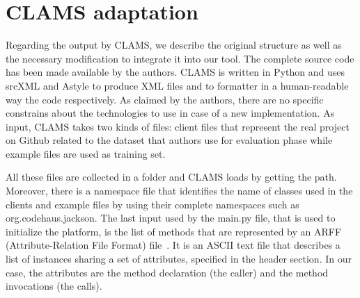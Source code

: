 





\section{CLAMS adaptation}

Regarding the output by CLAMS, we describe the original structure as well as the necessary modification to integrate it into our tool. The complete source code has been made available by the authors. CLAMS is written in Python and uses srcXML and Astyle to produce XML files and to formatter in a human-readable way the code respectively. As claimed by the authors, there are no specific constrains about the technologies to use in case of a new implementation. As input, CLAMS takes two kinds of files: client files that represent the real project on Github related to the dataset that authors use for evaluation phase while example files are used as training set.

All these files are collected in a folder and CLAMS loads by getting the path. Moreover, there is a namespace file that identifies the name of classes used in the clients and example files by using their complete namespaces such as org.codehaus.jackson. The last input used by the main.py file, that is used to initialize the platform, is the list of methods that are represented by an ARFF (Attribute-Relation File Format) file~\cite{https://www.cs.waikato.ac.nz_last_nodate}. It is an ASCII text file that describes a list of instances sharing a set of attributes, specified in the header section. In our case, the attributes are the method declaration (the caller) and the method invocations (the calls). 

